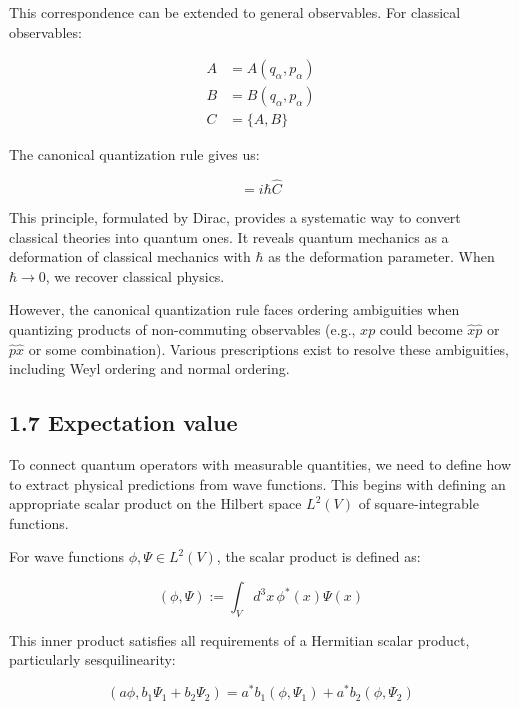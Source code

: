 \documentclass[10pt]{article}
\begin{document}
This correspondence can be extended to general observables. For classical observables:

\begin{align*}
A &= A(q_\alpha, p_\alpha) \\
B &= B(q_\alpha, p_\alpha) \tag{1.76} \\
C &= \{A, B\}
\end{align*}

The canonical quantization rule gives us:

\begin{equation*}
[\hat{A}, \hat{B}] = i\hbar\hat{C} \tag{1.77}
\end{equation*}

This principle, formulated by Dirac, provides a systematic way to convert classical theories into quantum ones. It reveals quantum mechanics as a deformation of classical mechanics with $\hbar$ as the deformation parameter. When $\hbar \to 0$, we recover classical physics.

However, the canonical quantization rule faces ordering ambiguities when quantizing products of non-commuting observables (e.g., $xp$ could become $\hat{x}\hat{p}$ or $\hat{p}\hat{x}$ or some combination). Various prescriptions exist to resolve these ambiguities, including Weyl ordering and normal ordering.

\subsection*{1.7 Expectation value}

To connect quantum operators with measurable quantities, we need to define how to extract physical predictions from wave functions. This begins with defining an appropriate scalar product on the Hilbert space $L^2(V)$ of square-integrable functions.


For wave functions $\phi, \Psi \in L^2(V)$, the scalar product is defined as:

\begin{equation*}
(\phi, \Psi) := \int_V d^3x \, \phi^*(x) \Psi(x) \tag{1.78}
\end{equation*}

This inner product satisfies all requirements of a Hermitian scalar product, particularly sesquilinearity:

\begin{equation*}
(a\phi, b_1\Psi_1 + b_2\Psi_2) = a^*b_1(\phi, \Psi_1) + a^*b_2(\phi, \Psi_2) \tag{1.79}
\end{equation*}
\end{document}

